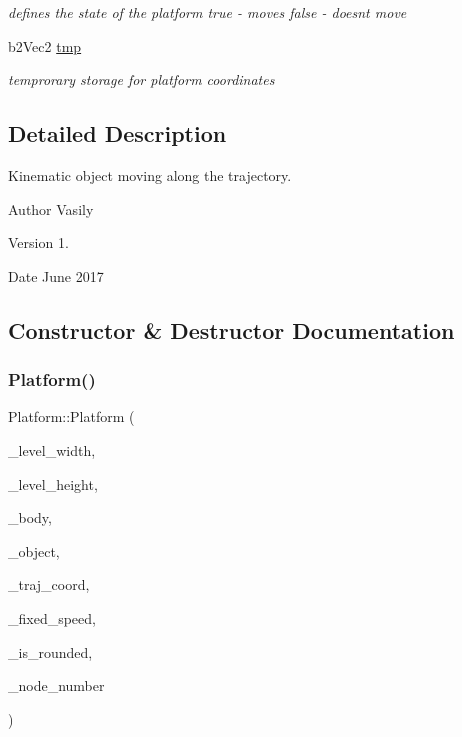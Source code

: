 \begin{DoxyCompactItemize}
\begin{DoxyCompactList}\small\item\em defines the state of the platform \textquotesingle{}true\textquotesingle{} -\/ moves \textquotesingle{}false\textquotesingle{} -\/ doesn\textquotesingle{}t move \end{DoxyCompactList}\item 
\mbox{\label{class_platform_a2f120cbb66ac4972fdd05ba816484dc0}} 
b2\+Vec2 \hyperlink{class_platform_a2f120cbb66ac4972fdd05ba816484dc0}{tmp}
\begin{DoxyCompactList}\small\item\em temprorary storage for platform coordinates \end{DoxyCompactList}\end{DoxyCompactItemize}


\subsection{Detailed Description}
Kinematic object moving along the trajectory. 

\begin{DoxyAuthor}{Author}
Vasily 
\end{DoxyAuthor}
\begin{DoxyVersion}{Version}
1. 
\end{DoxyVersion}
\begin{DoxyDate}{Date}
June 2017 
\end{DoxyDate}


\subsection{Constructor \& Destructor Documentation}
\mbox{\label{class_platform_a7c8e5045e5df1165c1154605e1a05339}} 
\subsubsection{\texorpdfstring{Platform()}{Platform()}}
{\footnotesize\ttfamily Platform\+::\+Platform (\begin{DoxyParamCaption}\item[{int}]{\+\_\+level\+\_\+width,  }\item[{int}]{\+\_\+level\+\_\+height,  }\item[{b2\+Body $\ast$}]{\+\_\+body,  }\item[{\hyperlink{class_object}{Object} $\ast$}]{\+\_\+object,  }\item[{std\+::vector$<$ std\+::pair$<$ double, double $>$$>$}]{\+\_\+traj\+\_\+coord,  }\item[{int}]{\+\_\+fixed\+\_\+speed,  }\item[{bool}]{\+\_\+is\+\_\+rounded,  }\item[{int}]{\+\_\+node\+\_\+number }\end{DoxyParamCaption})}



